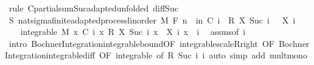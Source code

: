 \begin{isabellebody}
\ {\isacharparenleft}{\kern0pt}rule\ C{\isacharprime}{\kern0pt}{\isachardot}{\kern0pt}partial{\isacharunderscore}{\kern0pt}sum{\isacharunderscore}{\kern0pt}Suc{\isacharunderscore}{\kern0pt}adapted{\isacharbrackleft}{\kern0pt}unfolded\ diff{\isacharunderscore}{\kern0pt}Suc{\isacharunderscore}{\kern0pt}{}{\isacharbrackright}{\kern0pt}{\isacharparenright}{\kern0pt}\isanewline
\ \ \isamarkupfalse%
\ S{\isacharcolon}{\kern0pt}\ nat{\isacharunderscore}{\kern0pt}sigma{\isacharunderscore}{\kern0pt}finite{\isacharunderscore}{\kern0pt}adapted{\isacharunderscore}{\kern0pt}process{\isacharunderscore}{\kern0pt}linorder\ M\ F\ {\isachardoublequoteopen}{\isacharparenleft}{\kern0pt}{\isasymlambda}n\ {\isasymxi}{\isachardot}{\kern0pt}\ {\isasymSum}i{\isacharless}{\kern0pt}n{\isachardot}{\kern0pt}\ C\ i\ {\isasymxi}\ {\isacharasterisk}{\kern0pt}\isactrlsub R\ {\isacharparenleft}{\kern0pt}X\ {\isacharparenleft}{\kern0pt}Suc\ i{\isacharparenright}{\kern0pt}\ {\isasymxi}\ {\isacharminus}{\kern0pt}\ X\ i\ {\isasymxi}{\isacharparenright}{\kern0pt}{\isacharparenright}{\kern0pt}{\isachardoublequoteclose}\ \isacommand{{\isachardot}{\kern0pt}{\isachardot}{\kern0pt}}\isamarkupfalse%
\isanewline
\ \ \isamarkupfalse%
\ {\isachardoublequoteopen}integrable\ M\ {\isacharparenleft}{\kern0pt}{\isasymlambda}x{\isachardot}{\kern0pt}\ C\ i\ x\ {\isacharasterisk}{\kern0pt}\isactrlsub R\ {\isacharparenleft}{\kern0pt}X\ {\isacharparenleft}{\kern0pt}Suc\ i{\isacharparenright}{\kern0pt}\ x\ {\isacharminus}{\kern0pt}\ X\ i\ x{\isacharparenright}{\kern0pt}{\isacharparenright}{\kern0pt}{\isachardoublequoteclose}\ \ i\ \isamarkupfalse%
\ assms{\isacharparenleft}{\kern0pt}{}{\isacharcomma}{\kern0pt}{}{\isacharparenright}{\kern0pt}{\isacharbrackleft}{\kern0pt}of\ i{\isacharbrackright}{\kern0pt}\ \isamarkupfalse%
\ {\isacharparenleft}{\kern0pt}intro\ Bochner{\isacharunderscore}{\kern0pt}Integration{\isachardot}{\kern0pt}integrable{\isacharunderscore}{\kern0pt}bound{\isacharbrackleft}{\kern0pt}OF\ integrable{\isacharunderscore}{\kern0pt}scaleR{\isacharunderscore}{\kern0pt}right{\isacharcomma}{\kern0pt}\ OF\ Bochner{\isacharunderscore}{\kern0pt}Integration{\isachardot}{\kern0pt}integrable{\isacharunderscore}{\kern0pt}diff{\isacharcomma}{\kern0pt}\ OF\ integrable{\isacharparenleft}{\kern0pt}{}{\isacharcomma}{\kern0pt}{}{\isacharparenright}{\kern0pt}{\isacharcomma}{\kern0pt}\ of\ R\ {\isachardoublequoteopen}Suc\ i{\isachardoublequoteclose}\ i{\isacharbrackright}{\kern0pt}{\isacharparenright}{\kern0pt}\ {\isacharparenleft}{\kern0pt}auto\ simp\ add{\isacharcolon}{\kern0pt}\ mult{\isacharunderscore}{\kern0pt}mono{\isacharparenright}{\kern0pt}\isanewline

\end{isabellebody}
